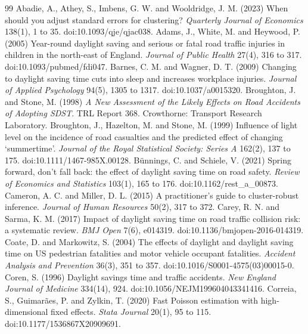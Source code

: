\documentclass[11pt,a4paper]{article}
\begin{document}
\begin{thebibliography}{99}
 Abadie, A., Athey, S., Imbens, G. W. and Wooldridge, J. M. (2023) When should you adjust standard errors for clustering? \textit{Quarterly Journal of Economics} 138(1), 1 to 35. doi:10.1093/qje/qjac038.
 Adams, J., White, M. and Heywood, P. (2005) Year-round daylight saving and serious or fatal road traffic injuries in children in the north-east of England. \textit{Journal of Public Health} 27(4), 316 to 317. doi:10.1093/pubmed/fdi047.
 Barnes, C. M. and Wagner, D. T. (2009) Changing to daylight saving time cuts into sleep and increases workplace injuries. \textit{Journal of Applied Psychology} 94(5), 1305 to 1317. doi:10.1037/a0015320.
 Broughton, J. and Stone, M. (1998) \textit{A New Assessment of the Likely Effects on Road Accidents of Adopting SDST}. TRL Report 368. Crowthorne: Transport Research Laboratory.
 Broughton, J., Hazelton, M. and Stone, M. (1999) Influence of light level on the incidence of road casualties and the predicted effect of changing `summertime'. \textit{Journal of the Royal Statistical Society: Series A} 162(2), 137 to 175. doi:10.1111/1467-985X.00128.
 B\"unnings, C. and Schiele, V. (2021) Spring forward, don't fall back: the effect of daylight saving time on road safety. \textit{Review of Economics and Statistics} 103(1), 165 to 176. doi:10.1162/rest\_a\_00873.
 Cameron, A. C. and Miller, D. L. (2015) A practitioner's guide to cluster-robust inference. \textit{Journal of Human Resources} 50(2), 317 to 372.
 Carey, R. N. and Sarma, K. M. (2017) Impact of daylight saving time on road traffic collision risk: a systematic review. \textit{BMJ Open} 7(6), e014319. doi:10.1136/bmjopen-2016-014319.
 Coate, D. and Markowitz, S. (2004) The effects of daylight and daylight saving time on US pedestrian fatalities and motor vehicle occupant fatalities. \textit{Accident Analysis and Prevention} 36(3), 351 to 357. doi:10.1016/S0001-4575(03)00015-0.
 Coren, S. (1996) Daylight savings time and traffic accidents. \textit{New England Journal of Medicine} 334(14), 924. doi:10.1056/NEJM199604043341416.
 Correia, S., Guimar\~aes, P. and Zylkin, T. (2020) Fast Poisson estimation with high-dimensional fixed effects. \textit{Stata Journal} 20(1), 95 to 115. doi:10.1177/1536867X20909691.

\end{thebibliography}
\end{document}
